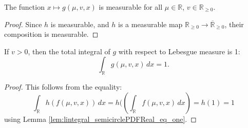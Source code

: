 \begin{lemma}
  \label{lem:measurable_semicirclePDF}
  The function \( x \mapsto g(\mu,v,x) \) is measurable for all \( \mu \in \mathbb{R} \), \( v \in \mathbb{R}_{\ge 0} \).
\end{lemma}
\begin{proof}
  Since $h$ is measurable, and $h$ is a measurable map \( \mathbb{R}_{\ge 0} \to \overline{\mathbb{R}}_{\ge 0} \), their composition is measurable.
\end{proof}

\begin{lemma}
  \label{lem:lintegral_semicirclePDF_eq_one}
  If \( v > 0 \), then the total integral of \( g \) with respect to Lebesgue measure is 1:
  \[
    \int_{\mathbb{R}} g(\mu,v,x) \, dx = 1.
  \]
\end{lemma}
\begin{proof}
  This follows from the equality:
  \[
  \int_{\mathbb{R}} h(f(\mu,v,x)) \, dx = h( \left( \int_{\mathbb{R}} f(\mu,v,x) \, dx \right) = h(1) = 1
  \]
  using Lemma \ref{lem:lintegral_semicirclePDFReal_eq_one}.
\end{proof}
